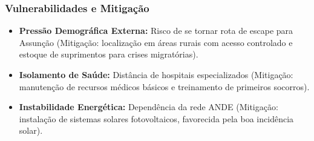 \subsubsection{Vulnerabilidades e
Mitigação}

\begin{itemize}
\tightlist
\item
  \textbf{Pressão Demográfica Externa:} Risco de se tornar rota de
  escape para Assunção (Mitigação: localização em áreas rurais com
  acesso controlado e estoque de suprimentos para crises migratórias).
\item
  \textbf{Isolamento de Saúde:} Distância de hospitais especializados
  (Mitigação: manutenção de recursos médicos básicos e treinamento de
  primeiros socorros).
\item
  \textbf{Instabilidade Energética:} Dependência da rede ANDE
  (Mitigação: instalação de sistemas solares fotovoltaicos, favorecida
  pela boa incidência solar).
\end{itemize}


